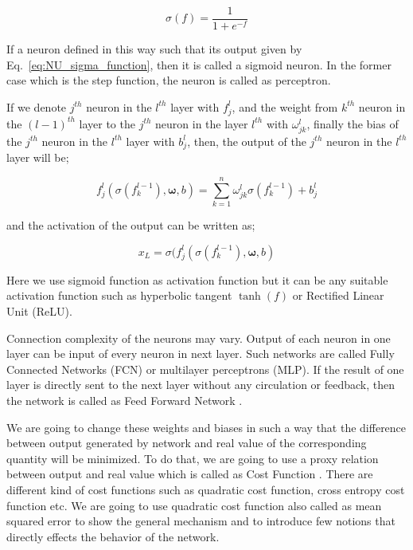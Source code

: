 \documentclass[a4paper,times,hidelinks,12pt]{article}
\begin{document}
\begin{equation}
\label{eq:NU_sigma_function}
\sigma(f) = \frac{1}{1 + e^{-f}}
\end{equation}

\noindent If a neuron defined in this way such that its output given by Eq.~\eqref{eq:NU_sigma_function}, then it is called a sigmoid neuron. In the former case which is the step function, the neuron is called as perceptron. 

If we denote $j^{th}$ neuron in the $l^{th}$ layer with $f_j^l$, and the weight from $k^{th}$ neuron in the $(l-1)^{th}$ layer to the $j^{th}$ neuron in the layer $l^{th}$ with $\omega_{jk}^l$, finally the bias of the $j^{th}$ neuron in the $l^{th}$ layer with ${b_j^l}$, then, the output of the $j^{th}$ neuron in the $l^{th}$ layer will be;

\begin{equation}
\label{eq:NU_neuron_connection}
f_j^{l}(\sigma(f_k^{l-1}), \boldsymbol{\omega}, b) = \sum\limits_{k=1}^{n} \omega_{jk}^{l}\sigma(f_k^{l-1}) + b_j^l
\end{equation}

\noindent and the activation of the output can be written as;

\begin{equation}
x_L = \sigma(f_j^{l}(\sigma(f_k^{l-1}), \boldsymbol{\omega}, b)
\end{equation}


\noindent Here we use sigmoid function as activation function but it can be any suitable activation function such as hyperbolic tangent $\tanh(f)$ or Rectified Linear Unit (ReLU).

Connection complexity of the neurons may vary. Output of each neuron in one layer can be input of every neuron in next layer. Such networks are called Fully Connected Networks (FCN) or multilayer perceptrons (MLP). If the result of one layer is directly sent to the next layer without any circulation or feedback, then the network is called as Feed Forward Network \cite{nielsen2015neural}.

We are going to change these weights and biases in such a way that the difference between output generated by network and real value of the corresponding quantity will be minimized. To do that, we are going to use a proxy relation between output and real value which is called as Cost Function \cite{nielsen2015neural}. There are different kind of cost functions such as quadratic cost function, cross entropy cost function etc. We are going to use quadratic cost function also called as mean squared error to show the general mechanism and to introduce few notions that directly effects the behavior of the network. 
\end{document}
